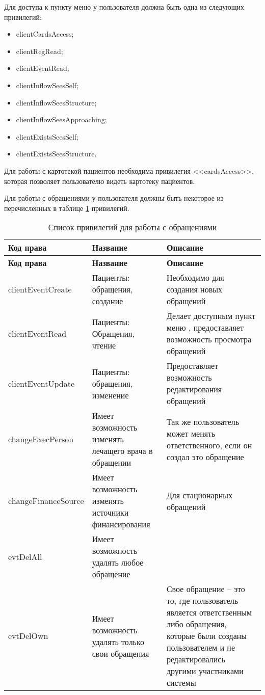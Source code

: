 Для доступа к пункту меню  у пользователя должна быть одна из следующих привилегий:
\begin{itemize}
 \item clientCardsAccess;
 \item clientRegRead;
 \item clientEventRead;
 \item clientInflowSeesSelf;
 \item clientInflowSeesStructure;
 \item clientInflowSeesApproaching;
 \item clientExistsSeesSelf;
 \item clientExistsSeesStructure.
\end{itemize}

Для работы с картотекой пациентов необходима привилегия <<cardsAccess>>, которая позволяет пользователю видеть картотеку пациентов.

Для работы с обращениями у пользователя должны быть некоторое из перечисленных в таблице \ref{tbl_acs_priv_obr} привилегий.

{\small
\begin{longtable}{|p{4cm}|p{5cm}|p{7.7cm}|}
\caption{Список привилегий для работы с обращениями \label{tbl_acs_priv_obr}} \\
\hline \rule{0pt}{15pt} \centering \textbf{Код права} & \centering \textbf{Название} & \hfil \textbf{Описание} \\ \hline
\endfirsthead
\hline \rule{0pt}{15pt} \centering \textbf{Код права} & \centering \textbf{Название} & \hfil \textbf{Описание} \\ \hline
\endhead
 clientEventCreate & 	Пациенты: обращения, создание &	Необходимо для создания новых обращений \\ \hline
 clientEventRead &	Пациенты: Обращения, чтение &	Делает доступным пункт меню \mm{Работа \str Обслуживание пациентов}, предоставляет возможность просмотра обращений \\ \hline
 clientEventUpdate &	Пациенты: обращения, изменение & 	Предоставляет возможность редактирования обращений \\ \hline
 changeExecPerson &	Имеет возможность изменять лечащего врача в обращении &	Так же пользователь может менять ответственного, если он создал это обращение \\ \hline
 changeFinanceSource & Имеет возможность изменять источники финансирования &	Для стационарных обращений \\ \hline
 evtDelAll & Имеет возможность удалять любое обращение &  \\ \hline 	
 evtDelOwn &	Имеет возможность удалять только свои обращения &	Свое обращение – это то, где пользователь является ответственным либо обращения, которые были созданы пользователем и не редактировались другими участниками системы \\ \hline
\end{longtable}
}


